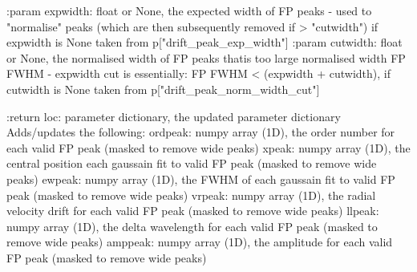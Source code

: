 \begin{minipage}{\textwidth}
\begin{pythondocstring}
:param expwidth: float or None, the expected width of FP peaks - used to
                 "normalise" peaks (which are then subsequently removed
                 if > "cutwidth") if expwidth is None taken from
                 p["drift_peak_exp_width"]
:param cutwidth: float or None, the normalised width of FP peaks thatis too
                 large normalised width FP FWHM - expwidth
                 cut is essentially: FP FWHM < (expwidth + cutwidth), if
                 cutwidth is None taken from p["drift_peak_norm_width_cut"]

:return loc: parameter dictionary, the updated parameter dictionary
        Adds/updates the following:
            ordpeak: numpy array (1D), the order number for each valid FP
                     peak (masked to remove wide peaks)
            xpeak: numpy array (1D), the central position each gaussain fit
                   to valid FP peak (masked to remove wide peaks)
            ewpeak: numpy array (1D), the FWHM of each gaussain fit
                    to valid FP peak (masked to remove wide peaks)
            vrpeak: numpy array (1D), the radial velocity drift for each
                    valid FP peak (masked to remove wide peaks)
            llpeak: numpy array (1D), the delta wavelength for each valid
                    FP peak (masked to remove wide peaks)
            amppeak: numpy array (1D), the amplitude for each valid FP peak
                     (masked to remove wide peaks)
\end{pythondocstring}
\end{minipage}

